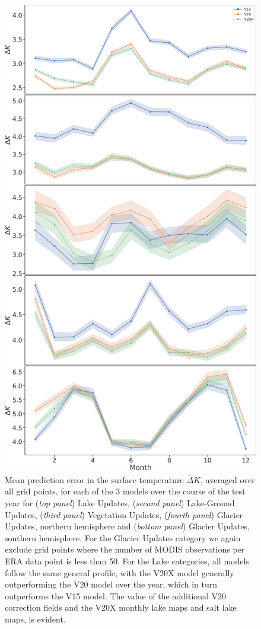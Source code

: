 \documentclass[hess, manuscript]{copernicus}
\begin{document}
	\begin{figure}
	\includegraphics[scale=0.2]{mega_stack_ns.png}
	\caption{Mean prediction error in the surface temperature $\bar{\Delta} K$, averaged over all grid points, for each of the 3 models over the course of the test year for (\textit{top panel}) Lake Updates, (\textit{second panel}) Lake-Ground Updates, (\textit{third panel}) Vegetation Updates, (\textit{fourth panel}) Glacier Updates, northern hemisphere and (\textit{bottom panel}) Glacier Updates, southern hemisphere. For the Glacier Updates category we again exclude grid points where the number of MODIS observations per ERA data point is less than 50.  For the Lake categories, all models follow the same general profile, with the V20X model generally outperforming the V20 model over the year, which in turn outperforms the V15 model. The value of the additional V20 correction fields and the V20X monthly lake maps and salt lake maps, is evident.}
	\label{fig:timeseries}
\end{figure}
\end{document}
